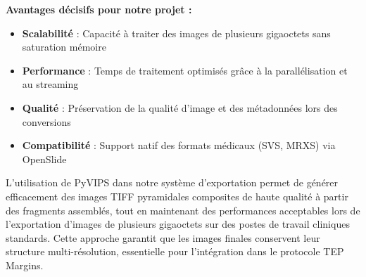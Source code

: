 \textbf{Avantages décisifs pour notre projet :}

\begin{itemize}[leftmargin=*]
    \item \textbf{Scalabilité} : Capacité à traiter des images de plusieurs gigaoctets sans saturation mémoire
    \item \textbf{Performance} : Temps de traitement optimisés grâce à la parallélisation et au streaming
    \item \textbf{Qualité} : Préservation de la qualité d'image et des métadonnées lors des conversions
    \item \textbf{Compatibilité} : Support natif des formats médicaux (SVS, MRXS) via OpenSlide
\end{itemize}

L'utilisation de PyVIPS dans notre système d'exportation permet de générer efficacement des images TIFF pyramidales composites de haute qualité à partir des fragments assemblés, tout en maintenant des performances acceptables lors de l'exportation d'images de plusieurs gigaoctets sur des postes de travail cliniques standards. Cette approche garantit que les images finales conservent leur structure multi-résolution, essentielle pour l'intégration dans le protocole TEP Margins.